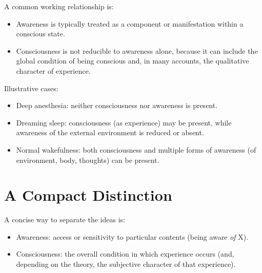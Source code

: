 \documentclass[a4paper]{article}
\begin{document}
        A common working relationship is:
        \begin{itemize}
            \item Awareness is typically treated as a component or manifestation within a conscious state.
            \item Consciousness is not reducible to awareness alone, because it can include the global condition of being conscious and, in many accounts, the qualitative character of experience.
        \end{itemize}
        
        Illustrative cases:
        \begin{itemize}
            \item Deep anesthesia: neither consciousness nor awareness is present.
            \item Dreaming sleep: consciousness (as experience) may be present, while awareness of the external environment is reduced or absent.
            \item Normal wakefulness: both consciousness and multiple forms of awareness (of environment, body, thoughts) can be present.
        \end{itemize}
    
    
    \section{A Compact Distinction}
        
        A concise way to separate the ideas is:
        \begin{itemize}
            \item Awareness: access or sensitivity to particular contents (being aware \emph{of} X).
            \item Consciousness: the overall condition in which experience occurs (and, depending on the theory, the subjective character of that experience).
        \end{itemize}
\end{document}
